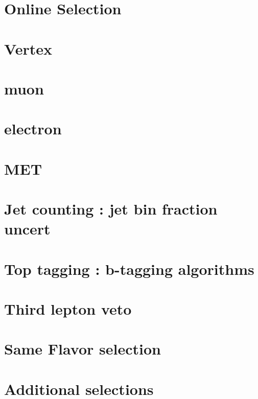 \section{Online Selection}
\section{ Vertex  }
\section{ muon  }
\section{ electron } 
\section{ MET  }
\section{ Jet counting : jet bin fraction uncert }
\section{ Top tagging : b-tagging algorithms }
\section{ Third lepton veto }
\section{ Same Flavor selection } 
\section{ Additional selections }
